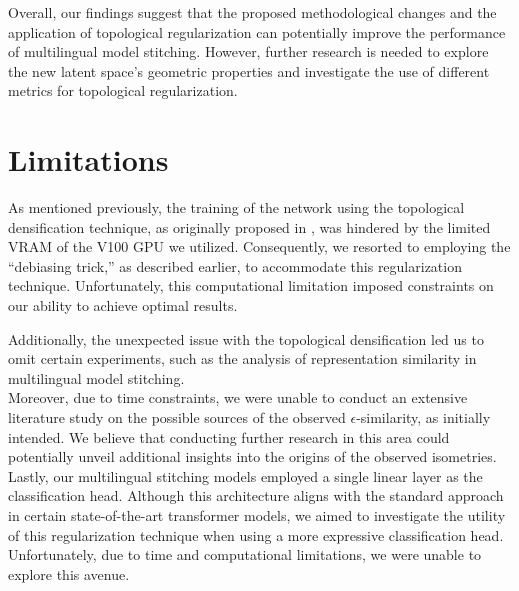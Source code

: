 \documentclass[../main.tex]{subfiles}
\begin{document}
Overall, our findings suggest that the proposed methodological changes and the application of topological regularization can potentially improve the performance of multilingual model stitching. However, further research is needed to explore the new latent space's geometric properties and investigate the use of different metrics for topological regularization.

\section{Limitations}
\label{sec:limitations}

As mentioned previously, the training of the network using the topological densification technique, as originally proposed in \cite{hofer_densified_2021}, was hindered by the limited VRAM of the V100 GPU we utilized. Consequently, we resorted to employing the ``debiasing trick,'' as described earlier, to accommodate this regularization technique. Unfortunately, this computational limitation imposed constraints on our ability to achieve optimal results.

Additionally, the unexpected issue with the topological densification led us to omit certain experiments, such as the analysis of representation similarity in multilingual model stitching.\\

Moreover, due to time constraints, we were unable to conduct an extensive literature study on the possible sources of the observed $\epsilon$-similarity, as initially intended. We believe that conducting further research in this area could potentially unveil additional insights into the origins of the observed isometries.\\

Lastly, our multilingual stitching models employed a single linear layer as the classification head. Although this architecture aligns with the standard approach in certain state-of-the-art transformer models, we aimed to investigate the utility of this regularization technique when using a more expressive classification head. Unfortunately, due to time and computational limitations, we were unable to explore this avenue.
\end{document}
